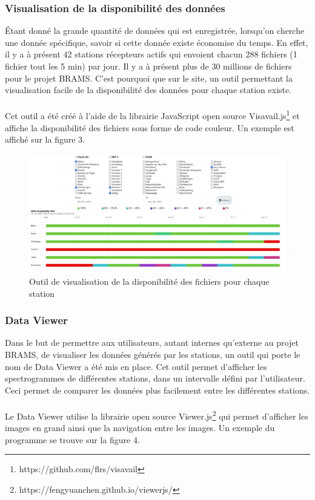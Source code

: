 \documentclass[11pt]{article}
\begin{document}
\subsubsection{Visualisation de la disponibilité des données}
Étant donné la grande quantité de données qui est enregistrée, lorsqu'on cherche une donnée spécifique, savoir si cette donnée existe économise du temps.
En effet, il y a à présent 42 stations récepteurs actifs qui envoient chacun 288 fichiers (1 fichier tout les 5 min) par jour.
Il y a à présent plus de 30 millions de fichiers pour le projet BRAMS.
C'est pourquoi que sur le site, un outil permettant la visualisation facile de la disponibilité des données pour chaque station existe.\\
\\
Cet outil a été créé à l'aide de la librairie JavaScript open source Visavail.js\footnote{https://github.com/flrs/visavail} et affiche la disponibilité des fichiers sous forme de code couleur.
Un exemple est affiché sur la figure 3.

\begin{figure}[t]
    \begin{center}
        \includegraphics[scale=0.155]{availability.png}
        \caption{Outil de visualisation de la disponibilité des fichiers pour chaque station}
    \end{center}
\end{figure}

\subsubsection{Data Viewer}
Dans le but de permettre aux utilisateurs, autant internes qu'externe au projet BRAMS, de visualiser les données générés par les stations, un outil qui porte le nom de Data Viewer a été mis en place.
Cet outil permet d'afficher les spectrogrammes de différentes stations, dans un intervalle défini par l'utilisateur.
Ceci permet de comparer les données plus facilement entre les différentes stations.\\
\\
Le Data Viewer utilise la librairie open source Viewer.js\footnote{https://fengyuanchen.github.io/viewerjs/} qui permet d'afficher les images en grand ainsi que la navigation entre les images.
Un exemple du programme se trouve sur la figure 4.
\end{document}
